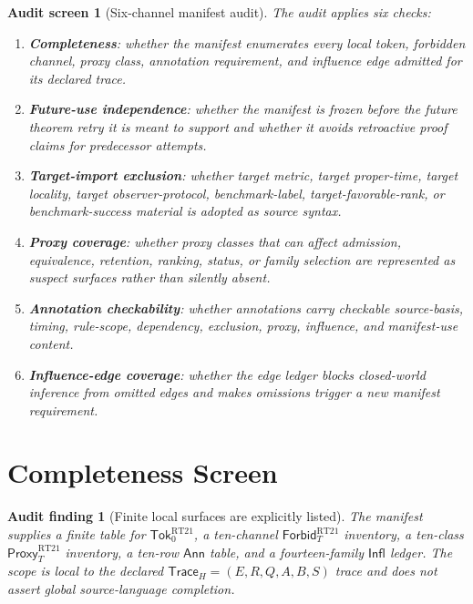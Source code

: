 \documentclass[11pt]{article}
\newcommand{\SrcTok}{\mathsf{Tok}_{0}}
\newcommand{\ForbidT}{\mathsf{Forbid}_{T}}
\newcommand{\ProxyT}{\mathsf{Proxy}_{T}}
\newcommand{\TraceH}{\mathsf{Trace}_{H}}
\newcommand{\Annot}{\mathsf{Ann}}
\newcommand{\Influence}{\mathsf{Infl}}
\newtheorem{auditscreen}{Audit screen}
\newtheorem{auditfinding}{Audit finding}
\begin{document}
\begin{auditscreen}[Six-channel manifest audit]
The audit applies six checks:
\begin{enumerate}
    \item \textbf{Completeness}: whether the manifest enumerates every local
    token, forbidden channel, proxy class, annotation requirement, and
    influence edge admitted for its declared trace.
    \item \textbf{Future-use independence}: whether the manifest is frozen
    before the future theorem retry it is meant to support and whether it
    avoids retroactive proof claims for predecessor attempts.
    \item \textbf{Target-import exclusion}: whether target metric,
    target proper-time, target locality, target observer-protocol,
    benchmark-label, target-favorable-rank, or benchmark-success material is
    adopted as source syntax.
    \item \textbf{Proxy coverage}: whether proxy classes that can affect
    admission, equivalence, retention, ranking, status, or family selection
    are represented as suspect surfaces rather than silently absent.
    \item \textbf{Annotation checkability}: whether annotations carry
    checkable source-basis, timing, rule-scope, dependency, exclusion,
    proxy, influence, and manifest-use content.
    \item \textbf{Influence-edge coverage}: whether the edge ledger blocks
    closed-world inference from omitted edges and makes omissions trigger a
    new manifest requirement.
\end{enumerate}
\end{auditscreen}

\section{Completeness Screen}

\begin{auditfinding}[Finite local surfaces are explicitly listed]
The manifest supplies a finite table for \(\SrcTok^{\mathrm{RT21}}\), a
ten-channel \(\ForbidT^{\mathrm{RT21}}\) inventory, a ten-class
\(\ProxyT^{\mathrm{RT21}}\) inventory, a ten-row \(\Annot\) table, and a
fourteen-family \(\Influence\) ledger. The scope is local to the declared
\(\TraceH=(E,R,Q,A,B,S)\) trace and does not assert global source-language
completion.
\end{auditfinding}
\end{document}
